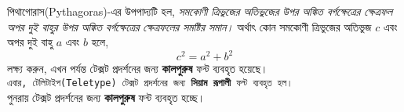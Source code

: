 \documentclass{article}
\begin{document}
	পিথাগোরাস(Pythagoras)-এর উপপাদ্যটি হল, \textit{সমকোণী ত্রিভুজের অতিভুজের উপর অঙ্কিত  
		বর্গক্ষেত্রের ক্ষেত্রফল অপর দুই বাহুর উপর অঙ্কিত বর্গক্ষেত্রের ক্ষেত্রফলের সমষ্টির সমান।}
	অর্থাৎ কোন সমকোণী ত্রিভুজের অতিভুজ $c$ এবং অপর দুই বাহু $a$ এবং $b$ হলে,
	\[c^2=a^2+b^2\]
	লক্ষ্য করুন, এখন পর্যন্ত টেক্সট প্রদর্শনের জন্য \textbf{কালপুরুষ} ফন্ট ব্যবহৃত হয়েছে।\\
	\texttt{এবার, টেলিটাইপ(Teletype) টেক্সট প্রদর্শনের জন্য \textbf{সিয়াম রূপালী} 
		ফন্ট ব্যবহৃত হল।}\\
	পুনরায় টেক্সট প্রদর্শনের জন্য \textbf{কালপুরুষ} ফন্ট ব্যবহৃত হচ্ছে।
\end{document}
